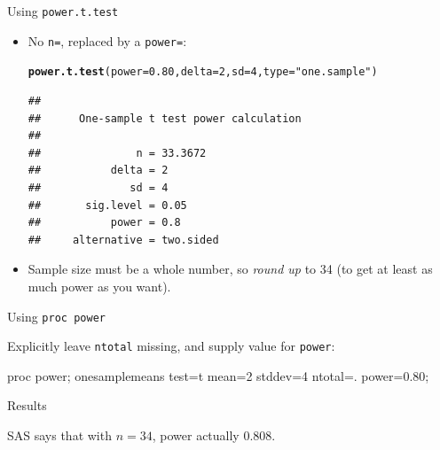 \documentclass[unknownkeysallowed]{beamer}\usepackage[]{graphicx}\usepackage[]{color}
\makeatletter
\newcommand{\hlnum}[1]{\textcolor[rgb]{0.686,0.059,0.569}{#1}}%
\newcommand{\hlstr}[1]{\textcolor[rgb]{0.192,0.494,0.8}{#1}}%
\newcommand{\hlstd}[1]{\textcolor[rgb]{0.345,0.345,0.345}{#1}}%
\newcommand{\hlkwc}[1]{\textcolor[rgb]{0.333,0.667,0.333}{#1}}%
\newcommand{\hlkwd}[1]{\textcolor[rgb]{0.737,0.353,0.396}{\textbf{#1}}}%
\newenvironment{kframe}{%
 \def\at@end@of@kframe{}%
 \ifinner\ifhmode%
  \def\at@end@of@kframe{\end{minipage}}%
  \begin{minipage}{\columnwidth}%
 \fi\fi%
 \def\FrameCommand##1{\hskip\@totalleftmargin \hskip-\fboxsep
 \colorbox{shadecolor}{##1}\hskip-\fboxsep
     \hskip-\linewidth \hskip-\@totalleftmargin \hskip\columnwidth}%
 \MakeFramed {\advance\hsize-\width
   \@totalleftmargin\z@ \linewidth\hsize
   \@setminipage}}%
 {\par\unskip\endMakeFramed%
 \at@end@of@kframe}
\newenvironment{knitrout}{}{} %
\makeatother
\begin{document}
\begin{frame}[fragile]{Using \texttt{power.t.test}}
  
  
  \begin{itemize}
  \item No \texttt{n=}, replaced by a \texttt{power=}:
\begin{knitrout}
\color{fgcolor}\begin{kframe}
\begin{alltt}
\hlkwd{power.t.test}\hlstd{(}\hlkwc{power}\hlstd{=}\hlnum{0.80}\hlstd{,}\hlkwc{delta}\hlstd{=}\hlnum{2}\hlstd{,}\hlkwc{sd}\hlstd{=}\hlnum{4}\hlstd{,}\hlkwc{type}\hlstd{=}\hlstr{"one.sample"}\hlstd{)}
\end{alltt}
\begin{verbatim}
## 
##      One-sample t test power calculation 
## 
##               n = 33.3672
##           delta = 2
##              sd = 4
##       sig.level = 0.05
##           power = 0.8
##     alternative = two.sided
\end{verbatim}
\end{kframe}
\end{knitrout}
\item Sample size must be a whole number, so \emph{round up} to 34 (to
  get at least as much power as you want).
  \end{itemize}
  
  
\end{frame}

\begin{frame}[fragile]{Using \texttt{proc power}}

  Explicitly leave \texttt{ntotal} missing, and supply value for
  \texttt{power}: 
  
    \begin{Sascode}[store=pc]
proc power;
  onesamplemeans
  test=t
  mean=2
  stddev=4
  ntotal=.
  power=0.80;
    \end{Sascode}

\end{frame}

\begin{frame}[fragile]{Results}
  
  
SAS says that with $n=34$, power
actually 0.808.

\end{frame}
\end{document}
